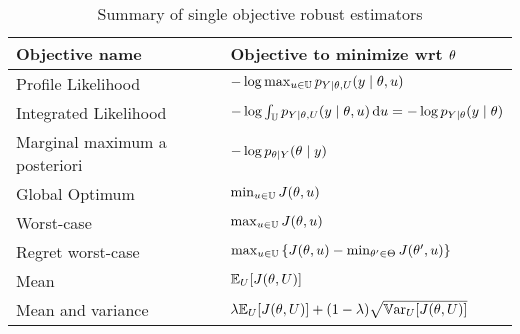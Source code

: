 \documentclass[../../Main_ManuscritThese.tex]{subfiles}
\begin{document}
\begin{table}[ht]
  \centering
  \begin{tabular}{ll}
    \toprule
    Objective name & Objective to minimize wrt $\theta$  \\ \midrule
    Profile Likelihood & $-\log \max_{u \in \mathbb{U}} p_{Y \mid \theta, U}(y \mid \theta, u)$  \\
    Integrated Likelihood & $-\log \int_{\mathbb{U}} p_{Y \mid \theta, U}(y \mid \theta, u) \,\mathrm{d}u=-\log p_{Y\mid \theta}(y\mid \theta)$ \\
    Marginal maximum a posteriori & $-\log p_{\theta\mid Y}(\theta \mid y)$  \\ \midrule
    Global Optimum & $\min_{u\in\mathbb{U}} J(\theta, u)$ \\
    Worst-case & $\max_{u \in \mathbb{U}} J(\theta, u)$ \\
    Regret worst-case & $\max_{u\in\mathbb{U}}\left\{J(\theta, u) - \min_{\theta^{\prime}\in\Theta} J(\theta^{\prime}, u)\right\}$ \\ \midrule
    Mean & $\mathbb{E}_{U}[J(\theta, U)]$  \\
    Mean and variance & $ \lambda \mathbb{E}_{U}[J(\theta, U)] + (1-\lambda) \sqrt{\mathbb{V}\mathrm{ar}_{U}[J(\theta, U)]}$  \\ \bottomrule
  \end{tabular}
  \caption{Summary of single objective robust estimators}
\end{table}
 
\subfileLocal{
	\pagestyle{empty}
	
	
      }
\end{document}
